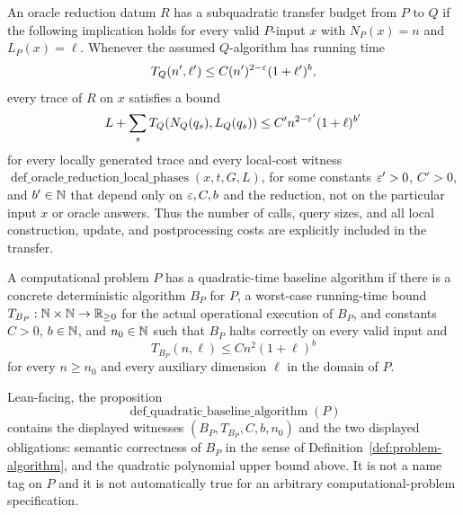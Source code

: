 \begin{definition}
  \label{def:subquadratic-oracle-query-budget}
  An oracle reduction datum $R$ has a subquadratic transfer budget from $P$ to
  $Q$ if the following implication holds for every valid $P$-input $x$ with
  $N_P(x)=n$ and $L_P(x)=\ell$.  Whenever the assumed $Q$-algorithm has running
  time
  \[
    T_Q(n',\ell')\leq C(n')^{2-\varepsilon}(1+\ell')^b,
  \]
  every trace of $R$ on $x$ satisfies a bound
  \[
    L+\sum_s T_Q(N_Q(q_s),L_Q(q_s))
      \leq C' n^{2-\varepsilon'}(1+\ell)^{b'}
  \]
  for every locally generated trace and every local-cost witness
  $\operatorname{def\_oracle\_reduction\_local\_phases}(x,t,G,L)$,
  for some constants $\varepsilon'>0$, $C'>0$, and $b'\in\mathbb{N}$ that depend only on
  $\varepsilon,C,b$ and the reduction, not on the particular input $x$ or oracle
  answers.  Thus the number of calls, query sizes, and all local construction,
  update, and postprocessing costs are explicitly included in the transfer.
\end{definition}

\begin{definition}
  \label{def:quadratic-baseline-algorithm}
  A computational problem $P$ has a quadratic-time baseline algorithm if there
  is a concrete deterministic algorithm $B_P$ for $P$, a worst-case running-time
  bound $T_{B_P}:\mathbb{N}\times\mathbb{N}\to\mathbb{R}_{\geq0}$ for the actual operational execution
  of $B_P$, and constants $C>0$, $b\in\mathbb{N}$, and $n_0\in\mathbb{N}$ such that $B_P$
  halts correctly on every valid input and
  \[
    T_{B_P}(n,\ell)\leq C n^2(1+\ell)^b
  \]
  for every $n\geq n_0$ and every auxiliary dimension $\ell$ in the domain of
  $P$.

  Lean-facing, the proposition
  \[
    \operatorname{def\_quadratic\_baseline\_algorithm}(P)
  \]
  contains the displayed witnesses $(B_P,T_{B_P},C,b,n_0)$ and the two
  displayed obligations: semantic correctness of $B_P$ in the sense of
  Definition~\ref{def:problem-algorithm}, and the quadratic polynomial upper
  bound above.  It is not a name tag on $P$ and it is not automatically true
  for an arbitrary computational-problem specification.
\end{definition}


